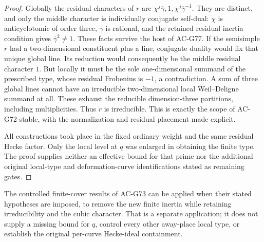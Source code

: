\begin{proof}
Globally the residual characters of \(r\) are
\(\chi^j\overline\gamma,1,\chi^j\overline\gamma^{-1}\).
They are distinct, and only the middle character is individually
conjugate self-dual: \(\chi\) is anticyclotomic of order three,
\(\gamma\) is rational, and the retained residual inertia
condition gives \(\overline\gamma^2\ne1\).
These facts survive the host of AC-G77.
If the semisimple \(r\) had a two-dimensional constituent plus
a line, conjugate duality would fix that unique global line.
Its reduction would consequently be the middle residual
character \(1\).
But locally it must be the sole one-dimensional summand of the
prescribed type, whose residual Frobenius is \(-1\), a
contradiction.
A sum of three global lines cannot have an irreducible
two-dimensional local Weil--Deligne summand at all.
These exhaust the reducible dimension-three partitions,
including multiplicities.
Thus \(r\) is irreducible.
This is exactly the scope of AC-G72-stable, with the normalization
and residual placement made explicit.

All constructions took place in the fixed ordinary weight
and the same residual Hecke factor.
Only the local level at \(q\) was enlarged in obtaining the
finite type.
The proof supplies neither an effective bound for that prime
nor the additional original local-type and deformation-curve
identifications stated as remaining gates.
\end{proof}

\begin{remark}
The controlled finite-cover results of AC-G73 can be applied
when their stated hypotheses are imposed, to remove the new
finite inertia while retaining irreducibility and the cubic
character.
That is a separate application; it does not supply a missing
bound for \(q\), control every other away-place local type,
or establish the original per-curve Hecke-ideal containment.
\end{remark}

